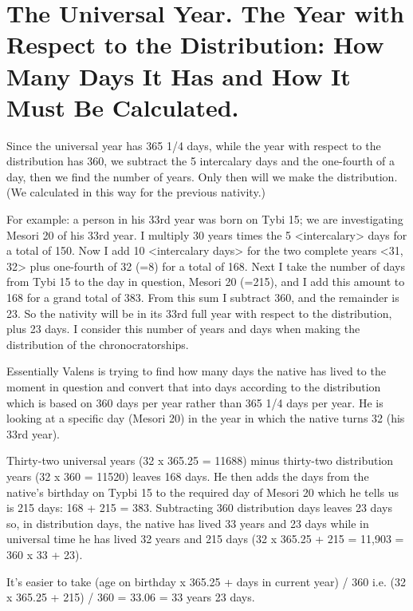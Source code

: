 \section{The Universal Year. The Year with Respect to the Distribution: How Many Days It Has and How It Must Be Calculated.}
Since the universal year has 365 1/4 days, while the year with respect to the distribution has 360, we subtract the 5 intercalary days and the one-fourth of a day, then we find the number of years. Only then will we make the distribution. (We calculated in this way for the previous nativity.) 

For example: a person in his 33rd year was born on Tybi 15; we are investigating Mesori 20 of his 33rd year. I multiply 30 years
times the 5 <intercalary> days for a total of 150. Now I add 10 <intercalary days> for the two complete years <31, 32> plus one-fourth of 32 (=8) for a total of 168. Next I take the number of days from Tybi 15 to the day in question, Mesori 20 (=215), and I add this amount to 168 for a grand total of 383. From this sum I subtract 360, and the remainder is 23. So the nativity will be in its 33rd full year with respect to the distribution, plus 23 days. I consider this number of years and days when making the distribution of the chronocratorships.

\begin{mdframed}[backgroundcolor=cyan!5]
\scriptsize
Essentially Valens is trying to find how many days the native has lived to the moment in question and convert that into days according to the distribution which is based on 360 days per year rather than 365 1/4 days per year. He is looking at a specific day (Mesori 20) in the year in which the native turns 32 (his 33rd year).

Thirty-two universal years (32 x 365.25 = 11688) minus thirty-two distribution years (32 x 360 = 11520) leaves 168 days. He then adds the days from the native's birthday on Typbi 15 to the required day of Mesori 20 which he tells us is 215 days: 168 + 215 = 383. Subtracting 360 distribution days leaves 23 days so, in distribution days, the native has lived 33 years and 23 days while in universal time he has lived 32 years and 215 days (32 x 365.25 + 215 = 11,903 = 360 x 33 + 23). 

It's easier to take (age on birthday x 365.25 + days in current year) / 360 i.e. (32 x 365.25 + 215) / 360 = 33.06 = 33 years 23 days.

\end{mdframed}

\newpage